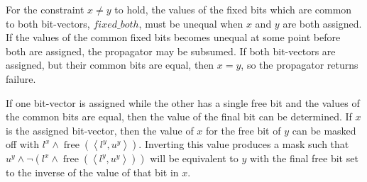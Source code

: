 \documentclass[a4paper,10pt,twoside,openright]{book}
\newcommand{\tuple}[1]{\left\langle #1\right\rangle}
\DeclareMathOperator{\free}{free}
\begin{document}
For the constraint $x \neq y$ to hold,
the values of the fixed bits which are common to both bit-vectors, $\mathit{fixed\_both}$,
must be unequal when $x$ and $y$ are both assigned.
If the values of the common fixed bits becomes unequal at some point
before both are assigned, the propagator may be subsumed.
If both bit-vectors are assigned, 
but their common bits are equal, 
then $x = y$, so the propagator returns failure.

If one bit-vector is assigned while the other has a single free bit and
the values of the common bits are equal,
then the value of the final bit can be determined.
If $x$ is the assigned bit-vector, 
then the value of $x$ for the free bit of $y$ 
can be masked off with
$l^x \land \free(\tuple{l^y,u^y})$.
Inverting this value produces a mask such that 
$u^y \land \lnot (l^x \land \free(\tuple{l^y,u^y}))$
will be equivalent to $y$ with the final free bit 
set to the inverse of the value of that bit in $x$.
\end{document}

